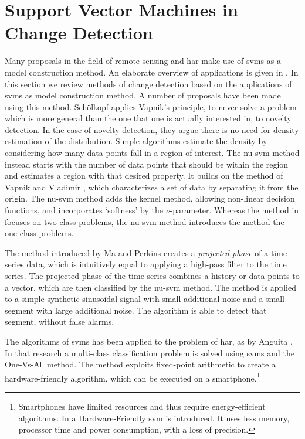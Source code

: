 \section{Support Vector Machines in Change Detection}\label{sec:svm_in_change_detection}

Many proposals in the field of remote sensing and \gls{har} make use of \glspl{svm} as a model construction method.
An elaborate overview of applications is given in \cite{mountrakis2011support}.
In this section we review methods of change detection based on the applications of \glspl{svm} as model construction method.
A number of proposals have been made using this method.
Sch{\"o}lkopf \etal \cite{scholkopf1999support} applies Vapnik's principle, to never solve a problem which is more general than the one that one is actually interested in, to novelty detection.
In the case of novelty detection, they argue there is no need for density estimation of the distribution.
Simple algorithms estimate the density by considering how many data points fall in a region of interest.
The \gls{nu-svm} method instead starts with the number of data points that should be within the region and estimates a region with that desired property.
It builds on the method of Vapnik and Vladimir \cite{vapnik1963pattern}, which characterizes a set of data by separating it from the origin.
The \gls{nu-svm} method adds the kernel method, allowing non-linear decision functions, and incorporates `softness' by the $\nu$-parameter.
Whereas the method in \cite{vapnik1963pattern} focuses on two-class problems, the \gls{nu-svm} method introduces the method the one-class problems.

The method introduced by Ma and Perkins \cite{ma2003time} creates a \emph{projected phase} of a time series data, which is intuitively equal to applying a high-pass filter to the time series.
The projected phase of the time series combines a history or data points to a vector, which are then classified by the \gls{nu-svm} method.
The method is applied to a simple synthetic sinusoidal signal with small additional noise and a small segment with large additional noise.
The algorithm is able to detect that segment, without false alarms.

The algorithms of \glspl{svm} has been applied to the problem of \gls{har}, as by Anguita \etal \cite{anguitahuman}.
In that research a multi-class classification problem is solved using \glspl{svm} and the One-Vs-All method.
The method exploits fixed-point arithmetic to create a hardware-friendly algorithm, which can be executed on a smartphone.\footnote{Smartphones have limited resources and thus require energy-efficient algorithms. In \cite{anguita2007hardware} a Hardware-Friendly \gls{svm} is introduced. It uses less memory, processor time and power consumption, with a loss of precision.}

